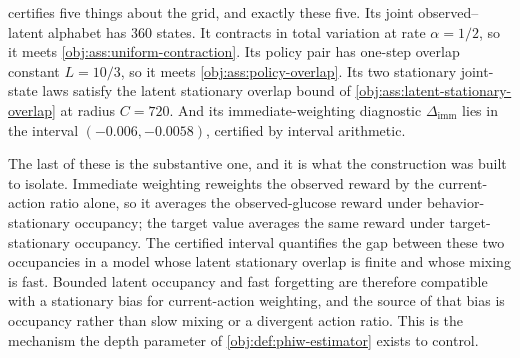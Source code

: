  certifies five things about the grid, and exactly these five. Its joint observed--latent alphabet has \(360\) states. It contracts in total variation at rate \(\alpha=1/2\), so it meets \cref{obj:ass:uniform-contraction}. Its policy pair has one-step overlap constant \(L=10/3\), so it meets \cref{obj:ass:policy-overlap}. Its two stationary joint-state laws satisfy the latent stationary overlap bound of \cref{obj:ass:latent-stationary-overlap} at radius \(C=720\). And its immediate-weighting diagnostic \(\Delta_{\mathrm{imm}}\) lies in the interval \((-0.006,-0.0058)\), certified by interval arithmetic.

The last of these is the substantive one, and it is what the construction was built to isolate. Immediate weighting reweights the observed reward by the current-action ratio alone, so it averages the observed-glucose reward under behavior-stationary occupancy; the target value averages the same reward under target-stationary occupancy. The certified interval quantifies the gap between these two occupancies in a model whose latent stationary overlap is finite and whose mixing is fast. Bounded latent occupancy and fast forgetting are therefore compatible with a stationary bias for current-action weighting, and the source of that bias is occupancy rather than slow mixing or a divergent action ratio. This is the mechanism the depth parameter of \cref{obj:def:phiw-estimator} exists to control.
